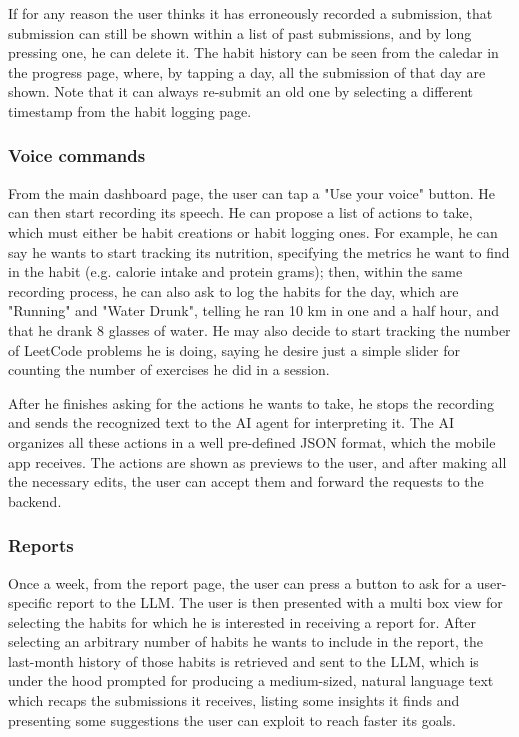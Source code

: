 \documentclass{article}
\begin{document}
If for any reason the user thinks it has erroneously recorded a submission, that submission can still be shown within a list of past submissions, and by long pressing one, he can delete it.
The habit history can be seen from the caledar in the progress page, where, by tapping a day, all the submission of that day are shown.
Note that it can always re-submit an old one by selecting a different timestamp from the habit logging page.

\subsubsection{Voice commands}

From the main dashboard page, the user can tap a "Use your voice" button.
He can then start recording its speech.
He can propose a list of actions to take, which must either be habit creations or habit logging ones.
For example, he can say he wants to start tracking its nutrition, specifying the metrics he want to find in the habit (e.g. calorie intake and protein grams); then, within the same recording process, he can also ask to log the habits for the day, which are "Running" and "Water Drunk", telling he ran 10 km in one and a half hour, and that he drank 8 glasses of water.
He may also decide to start tracking the number of LeetCode problems he is doing, saying he desire just a simple slider for counting the number of exercises he did in a session.

After he finishes asking for the actions he wants to take, he stops the recording and sends the recognized text to the AI agent for interpreting it.
The AI organizes all these actions in a well pre-defined JSON format, which the mobile app receives.
The actions are shown as previews to the user, and after making all the necessary edits, the user can accept them and forward the requests to the backend.

\subsubsection{Reports}

Once a week, from the report page, the user can press a button to ask for a user-specific report to the LLM.
The user is then presented with a multi box view for selecting the habits for which he is interested in receiving a report for.
After selecting an arbitrary number of habits he wants to include in the report, the last-month history of those habits is retrieved and sent to the LLM, which is under the hood prompted for producing a medium-sized, natural language text which recaps the submissions it receives, listing some insights it finds and presenting some suggestions the user can exploit to reach faster its goals.
\end{document}
